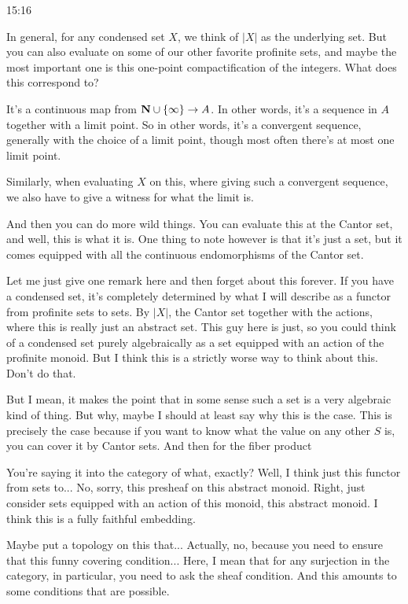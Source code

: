 \begin{unfinished}{15:16}
\begin{example}
\begin{remark}
In general, for any condensed set $X$, we think of $|X|$ as the underlying set. But you can also evaluate on some of our other favorite profinite sets, and maybe the most important one is this one-point compactification of the integers. What does this correspond to?

It's a continuous map from $\mathbf N \cup \{\infty\} \to A$. In other words, it's a sequence in $A$ together with a limit point. So in other words, it's a convergent sequence, generally with the choice of a limit point, though most often there's at most one limit point. 

Similarly, when evaluating $X$ on this, where giving such a convergent sequence, we also have to give a witness for what the limit is.

And then you can do more wild things. You can evaluate this at the Cantor set, and well, this is what it is. One thing to note however is that it's just a set, but it comes equipped with all the continuous endomorphisms of the Cantor set.

\begin{remark}
Let me just give one remark here and then forget about this forever. If you have a condensed set, it's completely determined by what I will describe as a functor from profinite sets to sets. By $|X|$, the Cantor set together with the actions, where this is really just an abstract set. This guy here is just, so you could think of a condensed set purely algebraically as a set equipped with an action of the profinite monoid. But I think this is a strictly worse way to think about this. Don't do that.

But I mean, it makes the point that in some sense such a set is a very algebraic kind of thing. But why, maybe I should at least say why this is the case. This is precisely the case because if you want to know what the value on any other $S$ is, you can cover it by Cantor sets. And then for the fiber product

You're saying it into the category of what, exactly? Well, I think just this functor from sets to... No, sorry, this presheaf on this abstract monoid. Right, just consider sets equipped with an action of this monoid, this abstract monoid. I think this is a fully faithful embedding.

Maybe put a topology on this that... Actually, no, because you need to ensure that this funny covering condition... Here, I mean that for any surjection in the category, in particular, you need to ask the sheaf condition. And this amounts to some conditions that are possible.


\end{remark}
\end{remark}
\end{example}
\end{unfinished}
